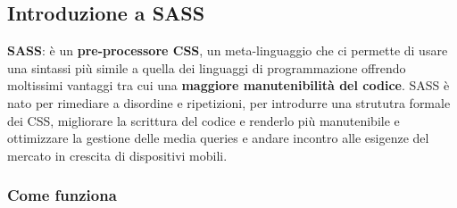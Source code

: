 \documentclass{article}
\begin{document}
\subsection{Introduzione a SASS}
\textbf{SASS}: è un \textbf{pre-processore CSS}, un meta-linguaggio che ci permette di usare una sintassi più simile a quella dei linguaggi di programmazione offrendo moltissimi vantaggi tra cui una \textbf{maggiore manutenibilità del codice}.
SASS è nato per rimediare a disordine e ripetizioni, per introdurre una strututra formale dei CSS, migliorare la scrittura del codice e renderlo più manutenibile e ottimizzare la gestione delle media queries e andare incontro alle esigenze del mercato in crescita di dispositivi mobili.
\subsubsection{Come funziona}
\end{document}
